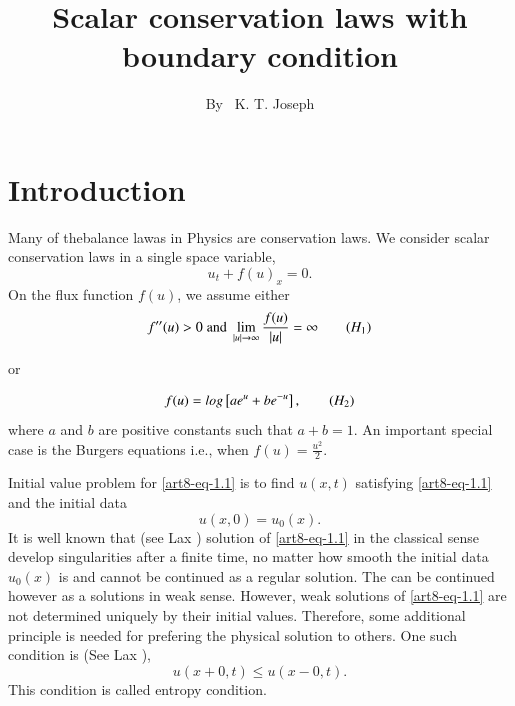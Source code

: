 \title{Scalar conservation laws with boundary condition}

\author{By~ K. T. Joseph}

\date{}
\maketitle

\section{Introduction}\label{art8-sec-1}

Many of the\pageoriginale balance lawas in Physics are conservation laws. We consider scalar conservation laws in a single space variable,
\begin{equation}\label{art8-eq-1.1}
u_{t}+f(u)_{x} = 0.
\end{equation}
On the flux function $f(u)$, we assume either
\begin{equation}\label{art8-eq-H1}
f''(u)> 0 \;\text{and}\; \lim\limits_{|u|\rightarrow \infty}\dfrac{f(u)}{|u|}= \infty\tag{$H_{1}$}
\end{equation}

\begin{center}
or
\end{center}
\begin{equation}\label{art8-eq-H2}
f(u) = log\left[ae^{u} + be^{-u}\right],\tag{$H_{2}$}
\end{equation}
where $a$ and $b$ are positive constants such that $a+b=1$. An important special case is the Burgers equations i.e., when $f(u) = \frac{u^{2}}{2}$.

Initial value problem for \eqref{art8-eq-1.1} is to find $u(x, t)$ satisfying  \eqref{art8-eq-1.1} and the initial data
\begin{equation}\label{art8-eq-1.2}
u(x, 0) = u_{0}(x).
\end{equation}
It is well known that (see Lax \cite{art8-key8}) solution of \eqref{art8-eq-1.1} in the classical sense develop singularities after a finite time, no matter how smooth the initial data $u_{0}(x)$ is and cannot be continued as a regular solution. The can be continued however as a solutions in weak sense. However, weak solutions of \eqref{art8-eq-1.1} are not determined uniquely by their initial values. Therefore, some additional principle is needed for prefering the physical solution to others. One such condition is (See Lax \cite{art8-key9}),
\begin{equation}\label{art8-eq-1.3}
u(x+0, t)\leq u(x-0,t).
\end{equation}
This condition is called entropy condition.

